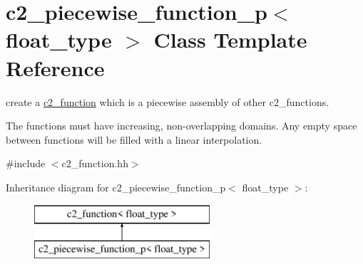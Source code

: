 \hypertarget{classc2__piecewise__function__p}{\section{c2\-\_\-piecewise\-\_\-function\-\_\-p$<$ float\-\_\-type $>$ Class Template Reference}
\label{classc2__piecewise__function__p}
}


create a \hyperlink{classc2__function}{c2\-\_\-function} which is a piecewise assembly of other c2\-\_\-functions.

The functions must have increasing, non-\/overlapping domains. Any empty space between functions will be filled with a linear interpolation.  




{\ttfamily \#include $<$c2\-\_\-function.\-hh$>$}

Inheritance diagram for c2\-\_\-piecewise\-\_\-function\-\_\-p$<$ float\-\_\-type $>$\-:\begin{figure}[H]
\begin{center}
\leavevmode
\includegraphics[height=2.000000cm]{classc2__piecewise__function__p}
\end{center}
\end{figure}
